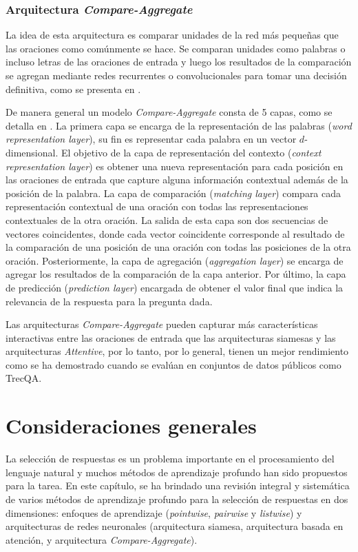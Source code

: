 \subsubsection{Arquitectura \textit{Compare-Aggregate}}

La idea de esta arquitectura es comparar unidades de la red más pequeñas que las oraciones como comúnmente se hace. Se comparan unidades como palabras o incluso letras de las oraciones de entrada y luego los resultados de la comparación se agregan mediante redes recurrentes o convolucionales para tomar una decisión definitiva, como se presenta en \cite{2018-tran-context}.

De manera general un modelo \textit{Compare-Aggregate} consta de 5 capas, como se detalla en \cite{2017-wang-bimpm}. La primera capa se encarga de la representación de las palabras (\textit{word representation layer}), su fin es representar cada palabra en un vector $d$-dimensional. El objetivo de la capa de representación del contexto (\textit{context representation layer}) es obtener una nueva representación para cada posición en las oraciones de entrada que capture alguna información contextual además de la posición de la palabra. La capa de comparación (\textit{matching layer}) compara cada representación contextual de una oración con todas las representaciones contextuales de la otra oración. La salida de esta capa son dos secuencias de vectores coincidentes, donde cada vector coincidente corresponde al resultado de la comparación de una posición de una oración con todas las posiciones de la otra oración. Posteriormente, la capa de agregación (\textit{aggregation layer}) se encarga de agregar los resultados de la comparación de la capa anterior. Por último, la capa de predicción (\textit{prediction layer}) encargada de obtener el valor final que indica la relevancia de la respuesta para la pregunta dada.

Las arquitecturas \textit{Compare-Aggregate} pueden capturar más características interactivas entre las oraciones de entrada que las arquitecturas siamesas y las arquitecturas \textit{Attentive}, por lo tanto, por lo general, tienen un mejor rendimiento como se ha demostrado cuando se evalúan en conjuntos de datos públicos como TrecQA.


\section{Consideraciones generales}

La selección de respuestas es un problema importante en el procesamiento del lenguaje natural y muchos métodos de aprendizaje profundo han sido propuestos para la tarea. En este capítulo, se ha brindado una revisión integral y sistemática de varios métodos de aprendizaje profundo para la selección de respuestas en dos dimensiones: enfoques de aprendizaje (\textit{pointwise}, \textit{pairwise} y \textit{listwise}) y arquitecturas de redes neuronales (arquitectura siamesa, arquitectura basada en atención, y arquitectura \textit{Compare-Aggregate}).

